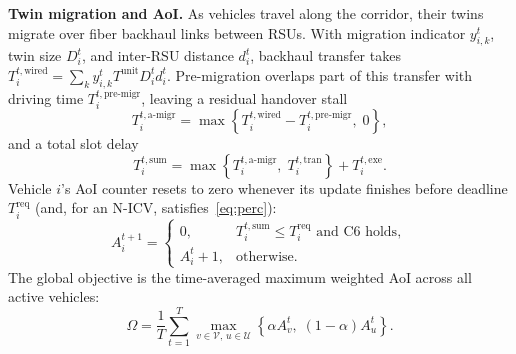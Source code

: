 \documentclass[conference]{IEEEtran}
\begin{document}
\textbf{Twin migration and AoI.} As vehicles travel along the corridor, their twins migrate over fiber backhaul links between RSUs. With migration indicator $y^t_{i,k}$, twin size $D^t_i$, and inter-RSU distance $d^t_i$, backhaul transfer takes $T^{t,\mathrm{wired}}_i = \sum_k y^t_{i,k} T^{\mathrm{unit}} D^t_i d^t_i$. Pre-migration overlaps part of this transfer with driving time $T^{t,\text{pre-migr}}_i$, leaving a residual handover stall
\begin{equation}
T^{t,\text{a-migr}}_i=\max\left\{T^{t,\mathrm{wired}}_i-T^{t,\text{pre-migr}}_i,\;0\right\},
\label{eq:migr}
\end{equation}
and a total slot delay
\begin{equation}
T^{t,\mathrm{sum}}_i=\max\left\{T^{t,\text{a-migr}}_i,\;T^{t,\mathrm{tran}}_i\right\}+T^{t,\mathrm{exe}}_i.
\label{eq:total}
\end{equation}
Vehicle $i$'s AoI counter resets to zero whenever its update finishes before deadline $T^{\mathrm{req}}_i$ (and, for an N-ICV, satisfies~\eqref{eq:perc}):
\begin{equation}
A^{t+1}_i=\begin{cases}0,& T^{t,\mathrm{sum}}_i\le T^{\mathrm{req}}_i \text{ and C6 holds},\\ A^t_i+1,&\text{otherwise.}\end{cases}
\label{eq:aoi}
\end{equation}
The global objective is the time-averaged maximum weighted AoI across all active vehicles:
\begin{equation}
\Omega=\frac{1}{T}\sum_{t=1}^{T}\max_{v\in\mathcal{V},\,u\in\mathcal{U}}\left\{\alpha A^t_v,\;(1-\alpha)A^t_u\right\}.
\label{eq:amwaoi}
\end{equation}
\end{document}

